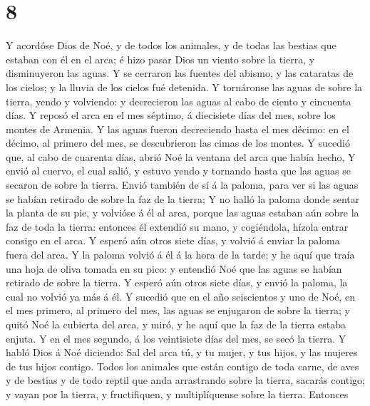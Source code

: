 \hypertarget{section-7}{%
\section{8}\label{section-7}}

 Y acordóse Dios de Noé, y de todos los animales, y de
todas las bestias que estaban con él en el arca; é hizo pasar Dios un
viento sobre la tierra, y disminuyeron las aguas.  Y se
cerraron las fuentes del abismo, y las cataratas de los cielos; y la
lluvia de los cielos fué detenida.  Y tornáronse las aguas
de sobre la tierra, yendo y volviendo: y decrecieron las aguas al cabo
de ciento y cincuenta días.  Y reposó el arca en el mes
séptimo, á diecisiete días del mes, sobre los montes de Armenia.
 Y las aguas fueron decreciendo hasta el mes décimo: en el
décimo, al primero del mes, se descubrieron las cimas de los montes.
 Y sucedió que, al cabo de cuarenta días, abrió Noé la
ventana del arca que había hecho,  Y envió al cuervo, el
cual salió, y estuvo yendo y tornando hasta que las aguas se secaron de
sobre la tierra.  Envió también de sí á la paloma, para
ver si las aguas se habían retirado de sobre la faz de la tierra;
 Y no halló la paloma donde sentar la planta de su pie, y
volvióse á él al arca, porque las aguas estaban aún sobre la faz de toda
la tierra: entonces él extendió su mano, y cogiéndola, hízola entrar
consigo en el arca.  Y esperó aún otros siete días, y
volvió á enviar la paloma fuera del arca.  Y la paloma
volvió á él á la hora de la tarde; y he aquí que traía una hoja de oliva
tomada en su pico: y entendió Noé que las aguas se habían retirado de
sobre la tierra.  Y esperó aún otros siete días, y envió
la paloma, la cual no volvió ya más á él.  Y sucedió que
en el año seiscientos y uno de Noé, en el mes primero, al primero del
mes, las aguas se enjugaron de sobre la tierra; y quitó Noé la cubierta
del arca, y miró, y he aquí que la faz de la tierra estaba enjuta.
 Y en el mes segundo, á los veintisiete días del mes, se
secó la tierra.  Y habló Dios á Noé diciendo:
 Sal del arca tú, y tu mujer, y tus hijos, y las mujeres
de tus hijos contigo.  Todos los animales que están
contigo de toda carne, de aves y de bestias y de todo reptil que anda
arrastrando sobre la tierra, sacarás contigo; y vayan por la tierra, y
fructifiquen, y multiplíquense sobre la tierra.  Entonces
